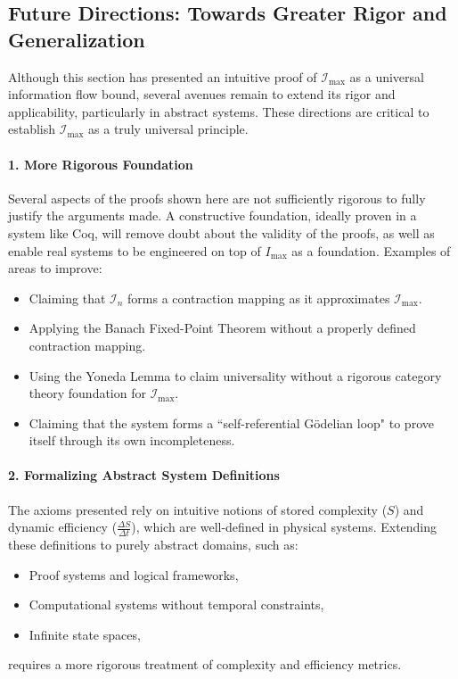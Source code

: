 \documentclass[12pt]{article}
\begin{document}
\subsection{Future Directions: Towards Greater Rigor and Generalization}

Although this section has presented an intuitive proof of \(\mathcal{I}_{\text{max}}\) as a universal information flow bound, several avenues remain to extend its rigor and applicability, particularly in abstract systems. These directions are critical to establish \(\mathcal{I}_{\text{max}}\) as a truly universal principle.

\paragraph{1. More Rigorous Foundation}
Several aspects of the proofs shown here are not sufficiently rigorous to fully justify the arguments made. A constructive foundation, ideally proven in a system like Coq, will remove doubt about the validity of the proofs, as well as enable real systems to be engineered on top of $I_\text{max}$ as a foundation. Examples of areas to improve:
\begin{itemize}
    \item Claiming that \(\mathcal{I}_n\) forms a contraction mapping as it approximates \(\mathcal{I}_{\text{max}}\).
    \item Applying the Banach Fixed-Point Theorem without a properly defined contraction mapping.
    \item Using the Yoneda Lemma to claim universality without a rigorous category theory foundation for \(\mathcal{I}_{\text{max}}\).
    \item Claiming that the system forms a ``self-referential Gödelian loop" to prove itself through its own incompleteness.
\end{itemize}


\paragraph{2. Formalizing Abstract System Definitions}
The axioms presented rely on intuitive notions of stored complexity (\(S\)) and dynamic efficiency (\(\frac{\Delta S}{\Delta t}\)), which are well-defined in physical systems. Extending these definitions to purely abstract domains, such as:
\begin{itemize}
    \item Proof systems and logical frameworks,
    \item Computational systems without temporal constraints,
    \item Infinite state spaces,
\end{itemize}
requires a more rigorous treatment of complexity and efficiency metrics.
\end{document}
